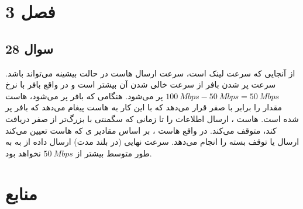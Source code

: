 \documentclass{article}
\begin{document}
\section{فصل 3}
\subsection{سوال 28}
از آنجایی که سرعت لینک  است، سرعت ارسال هاست  در حالت بیشینه  می‌تواند باشد. سرعت پر شدن بافر از سرعت خالی شدن آن بیشتر است و در واقع بافر با نرخ
$
100 \: Mbps - 50 \: Mbps = 50 \: Mbps
$
پر می‌شود. هنگامی که بافر پر می‌شود، هاست  مقدار  را برابر با صفر قرار می‌دهد که با این کار به هاست  پیغام می‌دهد که بافر پر شده است. هاست ، ارسال اطلاعات را تا زمانی که سگمنتی با  بزرگ‌تر از صفر دریافت کند، متوقف می‌کند. در واقع هاست ، بر اساس مقادیر ی که هاست  تعیین می‌کند ارسال یا توقف بسته را انجام می‌دهد. سرعت نهایی (در بلند مدت) ارسال داده از  به  به طور متوسط بیشتر از
$
50 \: Mbps
$
نخواهد بود.


\section*{منابع}
\renewcommand{\section}[2]{}%
\begin{thebibliography}{99} %


\begin{LTRitems}

\resetlatinfont

\end{LTRitems}

\end{thebibliography}
\end{document}
